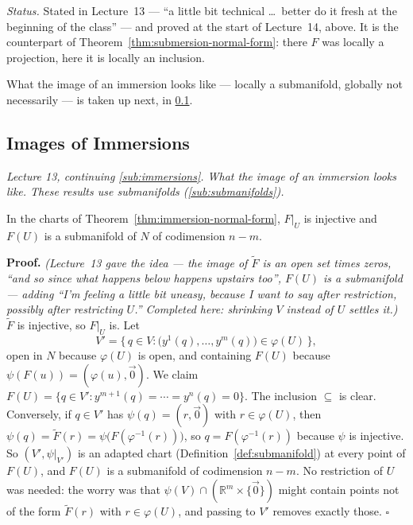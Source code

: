 \documentclass[11pt]{report}
\makeatletter
\newcounter{thmcounter}[section]
\renewenvironment{proof}[1][Proof]{\noindent\textbf{#1.} }{\hfill$\square$\par\vspace{5pt}}
\newcommand{\thmlabel}[1]{\edef\@currentlabel{\arabic{section}.\arabic{thmcounter}}\label{#1}}
\makeatother
\begin{document}
\textit{Status.} Stated in Lecture~13 --- ``a little bit technical \ldots\ better do it fresh at the beginning of the class'' --- and proved at the start of Lecture~14, above. It is the counterpart of Theorem~\ref{thm:submersion-normal-form}: there $F$ was locally a projection, here it is locally an inclusion.

What the image of an immersion looks like --- locally a submanifold, globally not necessarily --- is taken up next, in \ref{sub:immersion-images}.

\subsection{Images of Immersions}\label{sub:immersion-images}

\textit{Lecture 13, continuing \ref{sub:immersions}. What the image of an immersion looks like. These results use submanifolds (\ref{sub:submanifolds}).}

\begin{corbox}\thmlabel{cor:immersion-local-image}
In the charts of Theorem~\ref{thm:immersion-normal-form}, $F|_U$ is injective and $F(U)$ is a submanifold of $N$ of codimension $n - m$.
\end{corbox}

\begin{proof}
\textit{(Lecture~13 gave the idea --- the image of $\tilde F$ is an open set times zeros, ``and so since what happens below happens upstairs too'', $F(U)$ is a submanifold --- adding ``I'm feeling a little bit uneasy, because I want to say after restriction, possibly after restricting $U$.'' Completed here: shrinking $V$ instead of $U$ settles it.)} $\tilde F$ is injective, so $F|_U$ is. Let
\[
V' = \big\{\, q \in V : \big(y^1(q), \ldots, y^m(q)\big) \in \varphi(U) \,\big\},
\]
open in $N$ because $\varphi(U)$ is open, and containing $F(U)$ because $\psi(F(u)) = (\varphi(u), \vec 0)$. We claim $F(U) = \{ q \in V' : y^{m+1}(q) = \cdots = y^n(q) = 0 \}$. The inclusion $\subseteq$ is clear. Conversely, if $q \in V'$ has $\psi(q) = (r, \vec 0)$ with $r \in \varphi(U)$, then $\psi(q) = \tilde F(r) = \psi\big(F(\varphi^{-1}(r))\big)$, so $q = F(\varphi^{-1}(r))$ because $\psi$ is injective. So $(V', \psi|_{V'})$ is an adapted chart (Definition~\ref{def:submanifold}) at every point of $F(U)$, and $F(U)$ is a submanifold of codimension $n - m$. No restriction of $U$ was needed: the worry was that $\psi(V) \cap (\mathbb{R}^m \times \{\vec 0\})$ might contain points not of the form $\tilde F(r)$ with $r \in \varphi(U)$, and passing to $V'$ removes exactly those.
\end{proof}
\end{document}
